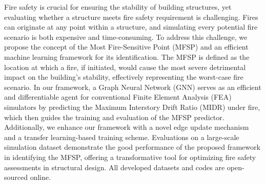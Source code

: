Fire safety is crucial for ensuring the stability of building structures, yet evaluating whether a structure meets fire safety requirement is challenging. Fires can originate at any point within a structure, and simulating every potential fire scenario is both expensive and time-consuming. To address this challenge, we propose the concept of the Most Fire-Sensitive Point (MFSP) and an efficient machine learning framework for its identification. The MFSP is defined as the location at which a fire, if initiated, would cause the most severe detrimental impact on the building’s stability, effectively representing the worst-case fire scenario. In our framework, a Graph Neural Network (GNN) serves as an efficient and differentiable agent for conventional Finite Element Analysis (FEA) simulators by predicting the Maximum Interstory Drift Ratio (MIDR) under fire, which then guides the training and evaluation of the MFSP predictor. Additionally, we enhance our framework with a novel edge update mechanism and a transfer learning-based training scheme. Evaluations on a large-scale simulation dataset demonstrate the good performance of the proposed framework in identifying the MFSP, offering a transformative tool for optimizing fire safety assessments in structural design. All developed datasets and codes are open-sourced online.